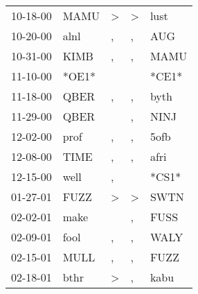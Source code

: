 \begin{supertabular}{p{0.07\textwidth}p{0.06\textwidth}p{0.02\textwidth}p{0.02\textwidth}p{0.06\textwidth}}
          10-18-00\textsuperscript{} &           MAMU\textsuperscript{} &     \textgreater &     \textgreater &           lust\textsuperscript{} \\
          10-20-00\textsuperscript{} &           alnl\textsuperscript{} &                , &                , &            AUG\textsuperscript{} \\
          10-31-00\textsuperscript{} &           KIMB\textsuperscript{} &                , &                , &           MAMU\textsuperscript{} \\
          11-10-00\textsuperscript{} &                            *OE1* &                  &                  &                            *CE1* \\
          11-18-00\textsuperscript{} &           QBER\textsuperscript{} &                , &                , &           byth\textsuperscript{} \\
          11-29-00\textsuperscript{} &           QBER\textsuperscript{} &                  &                , &           NINJ\textsuperscript{} \\
          12-02-00\textsuperscript{} &           prof\textsuperscript{} &                , &                , &           5ofb\textsuperscript{} \\
          12-08-00\textsuperscript{} &           TIME\textsuperscript{} &                , &                , &           afri\textsuperscript{} \\
          12-15-00\textsuperscript{} &           well\textsuperscript{} &                , &                  &                            *CS1* \\
          01-27-01\textsuperscript{} &           FUZZ\textsuperscript{} &     \textgreater &     \textgreater &           SWTN\textsuperscript{} \\
          02-02-01\textsuperscript{} &           make\textsuperscript{} &                  &                , &           FUSS\textsuperscript{} \\
          02-09-01\textsuperscript{} &           fool\textsuperscript{} &                , &                , &           WALY\textsuperscript{} \\
          02-15-01\textsuperscript{} &           MULL\textsuperscript{} &                , &                , &           FUZZ\textsuperscript{} \\
          02-18-01\textsuperscript{} &           bthr\textsuperscript{} &     \textgreater &                , &           kabu\textsuperscript{} \\

\end{supertabular}
